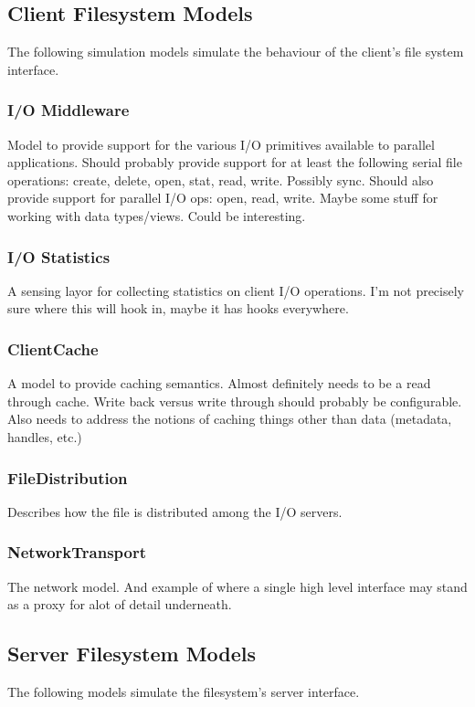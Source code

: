 \documentclass[11pt]{article}
\begin{document}
\subsection{Client Filesystem Models}
The following simulation models simulate the behaviour of the client's file
system interface.

\subsubsection{I/O Middleware}
Model to provide support for the various I/O primitives available to parallel
applications.  Should probably provide support for at least the following
serial file operations:  create, delete, open, stat, read, write.  Possibly 
sync.  Should also provide support for parallel I/O ops: open, read, write.
Maybe some stuff for working with data types/views.  Could be interesting.

\subsubsection{I/O Statistics}
A sensing layor for collecting statistics on client I/O operations.  I'm not
precisely sure where this will hook in, maybe it has hooks everywhere.

\subsubsection{ClientCache}
A model to provide caching semantics.  Almost definitely needs to be a read
through cache.  Write back versus write through should probably be
configurable.  Also needs to address the notions of caching things other than
data (metadata, handles, etc.)

\subsubsection{FileDistribution}
Describes how the file is distributed among the I/O servers.

\subsubsection{NetworkTransport}
The network model.  And example of where a single high level interface may
stand as a proxy for alot of detail underneath.

\subsection{Server Filesystem Models}
The following models simulate the filesystem's server interface.
\end{document}

